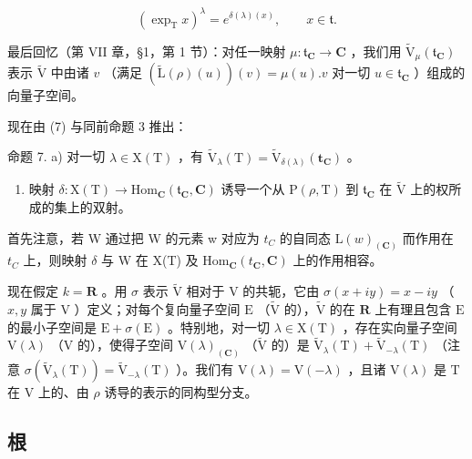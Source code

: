 \[
(\exp_ {\mathrm{T}} x) ^ {\lambda} = e ^ {\delta (\lambda) (x)}, \qquad x \in \mathfrak {t}.\tag{10}
\]

最后回忆（第 VII 章，§1，第 1 节）：对任一映射 \(\mu : \mathfrak{t}_{\mathbf{C}} \to \mathbf{C}\) ，我们用 \(\tilde{\mathrm{V}}_{\mu}(\mathfrak{t}_{\mathbf{C}})\) 表示 \(\tilde{\mathrm{V}}\) 中由诸 \(v\) （满足 \((\tilde{\mathrm{L}}(\rho)(u))(v) = \mu(u).v\) 对一切 \(u \in \mathfrak{t}_{\mathbf{C}}\) ）组成的向量子空间。

现在由 (7) 与同前命题 3 推出：

命题 7. a) 对一切 \(\lambda \in \mathrm{X(T)}\) ，有 \(\tilde{\mathrm{V}}_{\lambda}(\mathrm{T}) = \tilde{\mathrm{V}}_{\delta (\lambda)}(\mathbf{t}_{\mathbf{C}})\) 。

\begin{enumerate}
\def\labelenumi{\alph{enumi})}
\setcounter{enumi}{1}
\tightlist
\item
  映射 \(\delta : \mathrm{X(T)} \to \mathrm{Hom}_{\mathbf{C}}(\mathfrak{t}_{\mathbf{C}}, \mathbf{C})\) 诱导一个从 \(\mathrm{P}(\rho, \mathrm{T})\) 到 \(\mathfrak{t}_{\mathbf{C}}\) 在 \(\tilde{\mathrm{V}}\) 上的权所成的集上的双射。
\end{enumerate}

首先注意，若 W 通过把 W 的元素 w 对应为 \(t_{C}\) 的自同态 \(\mathrm{L}(w)_{(\mathbf{C})}\) 而作用在 \(t_{C}\) 上，则映射 \(\delta\) 与 W 在 X(T) 及 \(\mathrm{Hom}_{\mathbf{C}}(t_{\mathbf{C}}, \mathbf{C})\) 上的作用相容。

现在假定 \(k = \mathbf{R}\) 。用 \(\sigma\) 表示 \(\tilde{\mathrm{V}}\) 相对于 \(\mathrm{V}\) 的共轭，它由 \(\sigma(x + iy) = x - iy\) （\(x, y\) 属于 \(\mathrm{V}\) ）定义；对每个复向量子空间 \(\mathrm{E}\) （\(\tilde{\mathrm{V}}\) 的），\(\tilde{\mathrm{V}}\) 的在 \(\mathbf{R}\) 上有理且包含 \(\mathrm{E}\) 的最小子空间是 \(\mathrm{E} + \sigma(\mathrm{E})\) 。特别地，对一切 \(\lambda \in \mathrm{X}(\mathrm{T})\) ，存在实向量子空间 \(\mathrm{V}(\lambda)\) （\(\mathrm{V}\) 的），使得子空间 \(\mathrm{V}(\lambda)_{(\mathbf{C})}\) （\(\tilde{\mathrm{V}}\) 的）是 \(\tilde{\mathrm{V}}_{\lambda}(\mathrm{T}) + \tilde{\mathrm{V}}_{-\lambda}(\mathrm{T})\) （注意 \(\sigma(\tilde{\mathrm{V}}_{\lambda}(\mathrm{T})) = \tilde{\mathrm{V}}_{-\lambda}(\mathrm{T})\) ）。我们有 \(\mathrm{V}(\lambda) = \mathrm{V}(-\lambda)\) ，且诸 \(\mathrm{V}(\lambda)\) 是 \(\mathrm{T}\) 在 \(\mathrm{V}\) 上的、由 \(\rho\) 诱导的表示的同构型分支。

\subsection{根}

